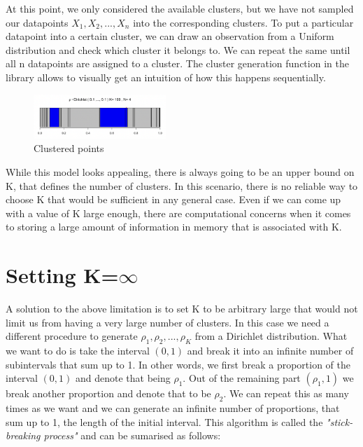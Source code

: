 \documentclass{article}
\begin{document}
At this point, we only considered the available clusters, but we have not sampled our datapoints $X_{1}, X_{2}, ..., X_{n}$ into the corresponding clusters. To put a particular datapoint into a certain cluster, we can draw an observation from a Uniform distribution and check which cluster it belongs to. We can repeat the same until all n datapoints are assigned to a cluster. The cluster generation function in the library allows to visually get an intuition of how this happens sequentially. 

\begin{figure} [H]
    \begin{center}
        \includegraphics[scale=1, width=5cm]{clustered_points.png}
        \caption{Clustered points}
        \label{fig:clustered_points}
    \end{center}
\end{figure}

While this model looks appealing, there is always going to be an upper bound on K, that defines the number of clusters. In this scenario, there is no reliable way to choose K that would be sufficient in any general case. Even if we can come up with a value of K large enough, there are computational concerns when it comes to storing a large amount of information in memory that is associated with K.

\section{Setting K=$\infty$}
A solution to the above limitation is to set K to be arbitrary large that would not limit us from having a very large number of clusters. In this case we need a different procedure to generate $\rho_{1}, \rho_{2}, ..., \rho_{K}$ from a Dirichlet distribution. What we want to do is take the interval $(0, 1)$ and break it into an infinite number of subintervals that sum up to 1. In other words, we first break a proportion of the interval $(0, 1)$ and denote that being $\rho_{1}$. Out of the remaining part $(\rho_{1}, 1)$ we break another proportion and denote that to be $\rho_{2}$. We can repeat this as many times as we want and we can generate an infinite number of proportions, that sum up to 1, the length of the initial interval. This algorithm is called the \textit{"stick-breaking process"} and can be sumarised as follows: 
\end{document}

